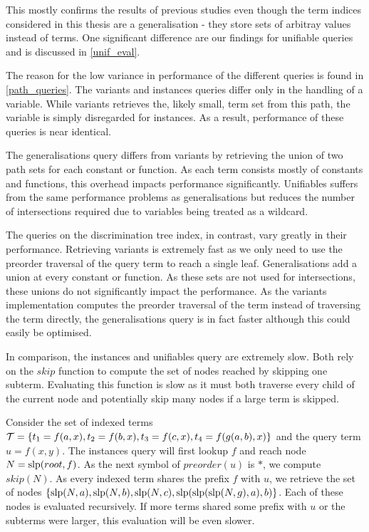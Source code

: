 This mostly confirms the results of previous studies \cite{stickel_path-indexing_1989,mccune_experiments_1992,carbonell_comparison_1995} even though the term indices considered in this thesis are a generalisation - they store sets of arbitray values instead of terms. One significant difference are our findings for unifiable queries and is discussed in \cref{unif_eval}.

The reason for the low variance in performance of the different queries is found in \cref{path_queries}. The variants and instances queries differ only in the handling of a variable. While variants retrieves the, likely small, term set from this path, the variable is simply disregarded for instances. As a result, performance of these queries is near identical.

The generalisations query differs from variants by retrieving the union of two path sets for each constant or function. As each term consists mostly of constants and functions, this overhead impacts performance significantly. Unifiables suffers from the same performance problems as generalisations but reduces the number of intersections required due to variables being treated as a wildcard.

The queries on the discrimination tree index, in contrast, vary greatly in their performance.
Retrieving variants is extremely fast as we only need to use the preorder traversal of the query term to reach a single leaf. Generalisations add a union at every constant or function. As these sets are not used for intersections, these unions do not significantly impact the performance. As the variants implementation computes the preorder traversal of the term instead of traversing the term directly, the generalisations query is in fact faster although this could easily be optimised.

In comparison, the instances and unifiables query are extremely slow.
Both rely on the $skip$ function to compute the set of nodes reached by skipping one subterm.
Evaluating this function is slow as it must both traverse every child of the current node and potentially skip many nodes if a large term is skipped.

\begin{exmpl}
  Consider the set of indexed terms $\mathcal{T} = \{t_{1} = f(a,x), t_{2} = f(b,x), t_{3} = f(c,x), t_{4} = f(g(a,b),x)\}$ and the query term $u = f(x,y)$.
  The instances query will first lookup $f$ and reach node $N = \mathrm{slp}(root,f)$. As the next symbol of $preorder(u)$ is $*$, we compute $skip(N)$. As every indexed term shares the prefix $f$ with $u$, we retrieve the set of nodes $\{\mathrm{slp}(N,a), \mathrm{slp}(N,b), \mathrm{slp}(N,c), \mathrm{slp}(\mathrm{slp}(\mathrm{slp}(N,g),a),b)\}$. Each of these nodes is evaluated recursively.
  If more terms shared some prefix with $u$ or the subterms were larger, this evaluation will be even slower.
\end{exmpl}

